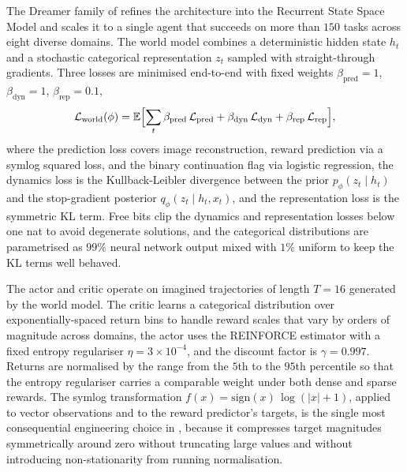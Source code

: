 The Dreamer family of \citet{Hafner2025} refines the architecture into the
Recurrent State Space Model and scales it to a single agent that succeeds on more
than $150$ tasks across eight diverse domains. The world model combines a
deterministic hidden state $h_t$ and a stochastic categorical representation $z_t$
sampled with straight-through gradients. Three losses are minimised end-to-end
with fixed weights $\beta_{\mathrm{pred}} = 1$, $\beta_{\mathrm{dyn}} = 1$,
$\beta_{\mathrm{rep}} = 0.1$,
\begin{equation}
\mathcal L_{\mathrm{world}}(\phi)
= \mathbb E\Bigl[\sum_t
  \beta_{\mathrm{pred}}\, \mathcal L_{\mathrm{pred}}
  + \beta_{\mathrm{dyn}}\, \mathcal L_{\mathrm{dyn}}
  + \beta_{\mathrm{rep}}\, \mathcal L_{\mathrm{rep}}
\Bigr],
\label{eq:dreamer_world_loss}
\end{equation}
where the prediction loss covers image reconstruction, reward prediction via a
symlog squared loss, and the binary continuation flag via logistic regression, the
dynamics loss is the Kullback-Leibler divergence between the prior
$p_\phi(z_t \mid h_t)$ and the stop-gradient posterior $q_\phi(z_t \mid h_t, x_t)$,
and the representation loss is the symmetric KL term. Free bits clip the dynamics
and representation losses below one nat to avoid degenerate solutions, and the
categorical distributions are parametrised as $99\%$ neural network output mixed
with $1\%$ uniform to keep the KL terms well behaved.

The actor and critic operate on imagined trajectories of length $T = 16$ generated
by the world model. The critic learns a categorical distribution over
exponentially-spaced return bins to handle reward scales that vary by orders of
magnitude across domains, the actor uses the REINFORCE estimator with a fixed
entropy regulariser $\eta = 3 \times 10^{-4}$, and the discount factor is
$\gamma = 0.997$. Returns are normalised by the range from the $5$th to the
$95$th percentile so that the entropy regulariser carries a comparable weight
under both dense and sparse rewards. The symlog transformation $f(x) =
\mathrm{sign}(x)\, \log(|x| + 1)$, applied to vector observations and to the
reward predictor's targets, is the single most consequential engineering choice
in \citet{Hafner2025}, because it compresses target magnitudes symmetrically
around zero without truncating large values and without introducing
non-stationarity from running normalisation.

